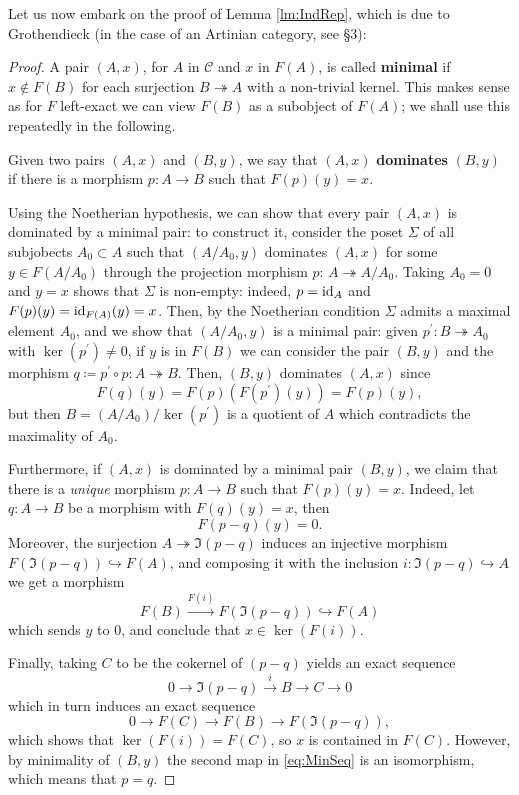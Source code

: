 \documentclass[a4paper, oneside]{memoir}
\begin{document}
Let us now embark on the proof of Lemma \ref{lm:IndRep}, which is
due to Grothendieck (in the case of an Artinian category, see \cite{Grothendieck} \S 3):
\begin{proof}A pair \((A,x)\), for \(A\) in \(\mathcal{C}\) and \(x\) in \(F(A)\), is called
    \textbf{minimal} if \(x\notin F(B)\) for each surjection \(B\twoheadrightarrow A\) with a non-trivial kernel. This makes sense as for \(F\) left-exact we can view \(F(B)\) as a subobject of \(F(A)\); we shall use this repeatedly in the following.

    Given two pairs \((A,x)\) and \((B,y)\), we say that \((A,x)\) \textbf{dominates} \((B,y)\) if there is a morphism \(p:A\to B\) such that \(F(p)(y)=x\).

    Using the Noetherian hypothesis, we can show that every pair \((A,x)\) is dominated by a minimal pair: to construct it, consider the poset \(\Sigma\) of all subjobects \(A_0 \subset A\) such that \((A/A_0,y)\) dominates \((A,x)\) for some \(y\in F(A/A_0)\)  through the projection morphism \(p:\,A\twoheadrightarrow A/A_0\).
    Taking \(A_0=0\) and \(y=x\) shows that \(\Sigma\) is non-empty: indeed, \(p=\operatorname{id}_A\) and \(F(p)(y)=\operatorname{id}_{F(A)}(y)=x\). Then, by the Noetherian condition \(\Sigma\) admits a maximal element \(A_0\), and we show that \((A/A_0,y)\) is a minimal pair: given \(p^{\prime} :B\twoheadrightarrow A_0\) with \(\ker(p^{\prime})\neq 0\), if \(y\) is in \(F(B)\) we can consider the pair \((B,y)\) and the morphism \(q\coloneqq p^{\prime} \circ p: A\twoheadrightarrow B\). Then, \((B,y)\) dominates \((A,x)\) since
    \[F(q)(y)=F(p)(F(p^{\prime} )(y))=F(p)(y),\]  but then \(B= (A/A_0)/\ker(p^{\prime})\) is a quotient of \(A\) which contradicts the maximality of \(A_0\).

    Furthermore, if \((A,x)\) is dominated by a minimal pair \((B,y)\), we claim that there is a \textit{unique} morphism \(p:A\to B\) such that \(F(p)(y)=x\).
    Indeed, let \(q:A\to B\) be a morphism with \(F(q)(y)=x\), then \[F(p-q)(y)= 0.\]
    Moreover, the surjection \(A\twoheadrightarrow\Im(p-q)\) induces an injective morphism \(F(\Im(p-q))\hookrightarrow F(A)\), and composing it with the inclusion \(i: \Im(p-q)\hookrightarrow A\) we get a morphism \[F(B)\overset{F(i)}{\to} F(\Im(p-q))\hookrightarrow F(A)\] which sends \(y\) to \(0\), and conclude that \(x\in\ker(F(i))\).

    Finally, taking \(C\) to be the cokernel of \((p-q)\) yields an exact sequence
    \begin{equation}\label{eq:MinSeq}
        0\to\Im(p-q)\overset{i}{\to} B\to C\to 0
    \end{equation}
    which in turn induces an exact sequence
    \[0\to F(C)\to F(B) \to F(\Im(p-q)),\]
    which shows that \(\ker(F(i))=F(C)\), so \(x\) is contained in \(F(C)\). However, by minimality of \((B,y)\) the second
    map in \eqref{eq:MinSeq} is an isomorphism, which means that \(p=q\).


\end{proof}
\end{document}
